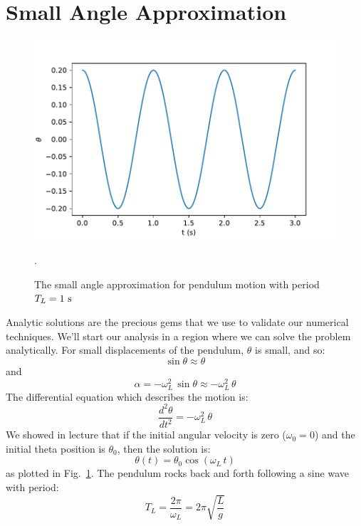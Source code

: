 \section{Small Angle Approximation}

\begin{figure}[htbp]
\begin{center}
 \includegraphics[height=0.33\textheight]{figs/pendulum/sho.pdf} 
\caption{The small angle approximation for pendulum motion with period $T_L=1~\rm s$}.
\label{fig:sho}
\end{center}
\end{figure}


Analytic solutions are the precious gems that we use to validate our
numerical techniques.  We'll start our analysis in a region where we
can solve the problem analytically.  For small displacements of the
pendulum, $\theta$ is small, and so:
\begin{displaymath}
\sin \theta \approx \theta
\end{displaymath}
and
\begin{displaymath}
\alpha = -\omega_L^2 \, \sin \theta \approx -\omega_L^2 \, \theta
\end{displaymath}
The differential equation which describes the motion is:
\begin{displaymath}
\frac{d^2\theta}{dt^2} = -\omega_L^2 \, \theta
\end{displaymath}
We showed in lecture that if the initial angular velocity is zero ($\omega_0 = 0$) and the initial theta position is $\theta_0$, then the solution is:
\begin{equation}
\label{eqn:sho}
\theta(t) = \theta_0 \cos(\omega_L \, t)
\end{equation}
as plotted in Fig.~\ref{fig:sho}.  The pendulum rocks back and forth
following a sine wave with period:
\begin{displaymath}
T_L = \frac{2 \pi}{ \omega_L} = 2 \pi \sqrt{\frac{L}{g}}
\end{displaymath}


